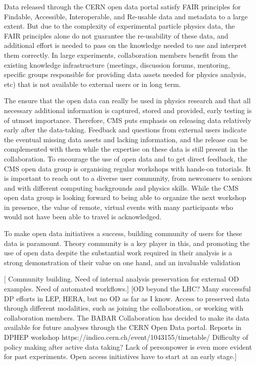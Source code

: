 \documentclass[11pt]{article}
\begin{document}
Data released through the CERN open data portal satisfy FAIR principles for Findable, Accessible, Interoperable, and Re-usable data and metadata to a large extent. But due to the complexity of experimental particle physics data, the FAIR principles alone do not guarantee the re-usability of these data, and additional effort is needed to pass on the knowledge needed to use and interpret them correctly. In large experiments, collaboration members benefit from the existing knowledge infrastructure (meetings, discussion forums, mentoring, specific groups responsible for providing data assets needed for physics analysis, etc) that is not available to external users or in long term. 


The ensure that the open data can really be used in physics research and that all necessary additional information is captured, stored and provided, early testing is of utmost importance. Therefore, CMS puts emphasis on releasing data relatively early after the data-taking. Feedback and questions from external users indicate the eventual missing data assets and lacking information, and the release can be complemented with them while the expertise on these data is still present in the collaboration. To encourage the use of open data and to get direct feedback, the CMS open data group is organising regular workshops with hands-on tutorials. It is important to reach out to a diverse user community, from newcomers to seniors and with different computing backgrounds and physics skills. While the CMS open data group is looking forward to being able to organize the next workshop in presence, the value of remote, virtual events with many participants who would not have been able to travel is acknowledged.

To make open data initiatives a success, building community of users for these data is paramount. Theory community is a key player in this, and promoting the use of open data despite the substantial work required in their analysis is a strong demonstration of their value on one hand, and an invaluable validation 

[ Community building.  Need of internal analysis preservation for external OD examples. Need of automated workflows.]
[OD beyond the LHC? Many successful DP efforts in LEP, HERA, but no OD as far as I know. Access to preserved data through different modalities, such as joining the collaboration, or working with collaboration members. The BABAR Collaboration has decided to make its data available for future analyses through the CERN Open Data portal. Reports in DPHEP workshop https://indico.cern.ch/event/1043155/timetable/ Difficulty of policy making after active data taking? Lack of personpower is even more evident for past experiments. Open access initiatives have to start at an early stage.]
\end{document}
